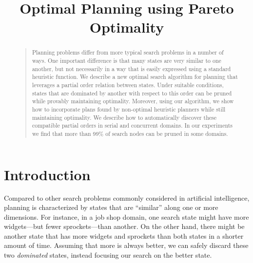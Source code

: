 \documentclass[letterpaper]{article}
\begin{document}
%
\title{Optimal Planning using Pareto Optimality}

\maketitle
\begin{abstract}
\begin{quote}
  Planning problems differ from more typical search problems in a
  number of ways.  One important difference is that many states are
  very similar to one another, but not necessarily in a way that
  is easily expressed using a standard heuristic function.  We
  describe a new optimal search algorithm for planning that leverages
  a partial order relation between states. Under suitable conditions,
  states that are dominated by another with respect to this order
  can be pruned while provably maintaining optimality.  Moreover,
  using our algorithm, we show how to incorporate plans found by
  non-optimal heuristic planners while still maintaining optimality.
  We describe how to automatically discover these compatible partial
  orders in serial and concurrent domains.  In our experiments we
  find that more than 99\% of search nodes can be pruned in some
  domains.
\end{quote}
\end{abstract}

\section{Introduction}

Compared to other search problems commonly considered in artificial
intelligence, planning is characterized by states that are ``similar''
along one or more dimensions.  For instance, in a job shop domain,
one search state might have more widgets---but fewer sprockets---than
another. On the other hand, there might be another state that has
more widgets and sprockets than both states in a shorter amount of
time. Assuming that more is always better, we can safely discard
these two \textit{dominated} states, instead focusing our search
on the better state.
\end{document}
